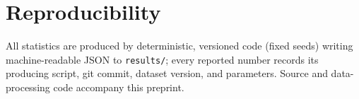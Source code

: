 \documentclass[11pt]{article}
\begin{document}
\section*{Reproducibility}
All statistics are produced by deterministic, versioned code (fixed seeds) writing
machine-readable JSON to \texttt{results/}; every reported number records its
producing script, git commit, dataset version, and parameters. Source and
data-processing code accompany this preprint.



\end{document}
